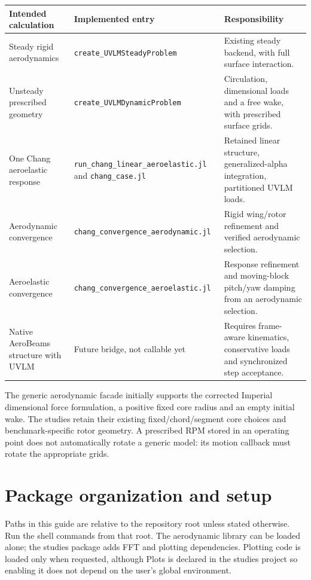 \documentclass[11pt,a4paper]{article}
\newcommand{\code}{\nolinkurl}
\begin{document}
\begin{longtable}{@{}L{.25\linewidth}L{.32\linewidth}L{.35\linewidth}@{}}
\toprule Intended calculation & Implemented entry & Responsibility\\\midrule\endhead
Steady rigid aerodynamics & \code{create_UVLMSteadyProblem} & Existing steady backend, with full surface interaction.\\
Unsteady prescribed geometry & \code{create_UVLMDynamicProblem} & Circulation, dimensional loads and a free wake, with prescribed surface grids.\\
One Chang aeroelastic response & \code{run_chang_linear_aeroelastic.jl} and \code{chang_case.jl} & Retained linear structure, generalized-alpha integration, partitioned UVLM loads.\\
Aerodynamic convergence & \code{chang_convergence_aerodynamic.jl} & Rigid wing/rotor refinement and verified aerodynamic selection.\\
Aeroelastic convergence & \code{chang_convergence_aeroelastic.jl} & Response refinement and moving-block pitch/yaw damping from an aerodynamic selection.\\
Native AeroBeams structure with UVLM & Future bridge, not callable yet & Requires frame-aware kinematics, conservative loads and synchronized step acceptance.\\
\bottomrule
\end{longtable}

The generic aerodynamic facade initially supports the corrected Imperial
dimensional force formulation, a positive fixed core radius and an empty
initial wake. The studies retain their existing fixed/chord/segment core
choices and benchmark-specific rotor geometry. A prescribed RPM stored in an
operating point does not automatically rotate a generic model: its motion
callback must rotate the appropriate grids.

\section{Package organization and setup}
\label{sec:setup}

Paths in this guide are relative to the repository root unless stated
otherwise. Run the shell commands from that root. The aerodynamic library can
be loaded alone; the studies package adds FFT and plotting dependencies.
Plotting code is loaded only when requested, although Plots is declared in the
studies project so enabling it does not depend on the user's global environment.
\end{document}
